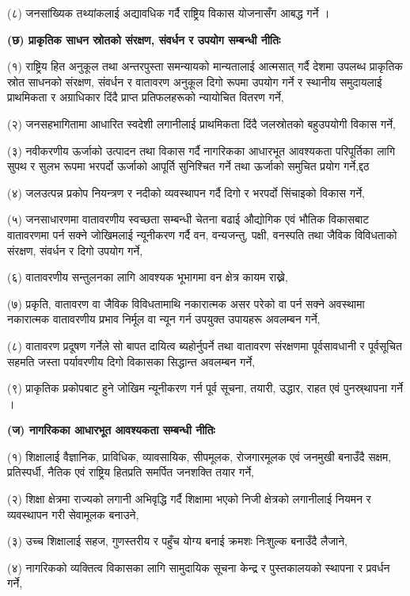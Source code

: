 (८) जनसांख्यिक तथ्यांकलाई अद्यावधिक गर्दै राष्ट्रिय विकास योजनासँग आबद्ध गर्ने ।

\textbf{(छ) प्राकृतिक साधन स्रोतको संरक्षण, संवर्धन र उपयोग सम्बन्धी नीतिः}

(१) राष्ट्रिय हित अनुकूल तथा अन्तरपुस्ता समन्यायको मान्यतालाई आत्मसात् गर्दै देशमा उपलब्ध प्राकृतिक स्रोत साधनको संरक्षण, संवर्धन र वातावरण अनुकूल दिगो रूपमा उपयोग गर्ने र स्थानीय समुदायलाई प्राथमिकता र अग्राधिकार दिंदै प्राप्त प्रतिफलहरूको न्यायोचित वितरण गर्ने,

(२) जनसहभागितामा आधारित स्वदेशी लगानीलाई प्राथमिकता दिंदै जलस्रोतको बहुउपयोगी विकास गर्ने,

(३) नवीकरणीय ऊर्जाको उत्पादन तथा विकास गर्दै नागरिकका आधारभूत आवश्यकता परिपूर्तिका लागि सुपथ र सुलभ रूपमा भरपर्दो ऊर्जाको आपूर्ति सुनिश्चित गर्ने तथा ऊर्जाको समुचित प्रयोग गर्ने,द्दठ

(४) जलउत्पन्न प्रकोप नियन्त्रण र नदीको व्यवस्थापन गर्दै दिगो र भरपर्दो सिंचाइको विकास गर्ने,

(५) जनसाधारणमा वातावरणीय स्वच्छता सम्बन्धी चेतना बढाई औद्योगिक एवं भौतिक विकासबाट वातावरणमा पर्न सक्ने जोखिमलाई न्यूनीकरण गर्दै वन, वन्यजन्तु, पक्षी, वनस्पति तथा जैविक विविधताको संरक्षण, संवर्धन र दिगो उपयोग गर्ने,

(६) वातावरणीय सन्तुलनका लागि आवश्यक भूभागमा वन क्षेत्र कायम राख्ने,

(७) प्रकृति, वातावरण वा जैविक विविधतामाथि नकारात्मक असर परेको वा पर्न सक्ने अवस्थामा नकारात्मक वातावरणीय प्रभाव निर्मूल वा न्यून गर्न उपयुक्त उपायहरू अवलम्बन गर्ने,

(८) वातावरण प्रदूषण गर्नेले सो बापत दायित्व ब्यहोर्नुपर्ने तथा वातावरण संरक्षणमा पूर्वसावधानी र पूर्वसूचित सहमति जस्ता पर्यावरणीय दिगो विकासका सिद्धान्त अवलम्बन गर्ने,

(९) प्राकृतिक प्रकोपबाट हुने जोखिम न्यूनीकरण गर्न पूर्व सूचना, तयारी, उद्धार, राहत एवं पुनस्र्थापना गर्ने ।

\textbf{(ज) नागरिकका आधारभूत आवश्यकता सम्बन्धी नीतिः}

(१) शिक्षालाई वैज्ञानिक, प्राविधिक, व्यावसायिक, सीपमूलक, रोजगारमूलक एवं जनमुखी बनाउँदै सक्षम, प्रतिस्पर्धी, नैतिक एवं राष्ट्रिय हितप्रति समर्पित जनशक्ति तयार गर्ने,

(२) शिक्षा क्षेत्रमा राज्यको लगानी अभिवृद्धि गर्दै शिक्षामा भएको निजी क्षेत्रको लगानीलाई नियमन र व्यवस्थापन गरी सेवामूलक बनाउने,

(३) उच्च शिक्षालाई सहज, गुणस्तरीय र पहुँच योग्य बनाई क्रमशः निःशुल्क बनाउँदै लैजाने,

(४) नागरिकको व्यक्तित्व विकासका लागि सामुदायिक सूचना केन्द्र र पुस्तकालयको स्थापना र प्रवर्धन गर्ने,

